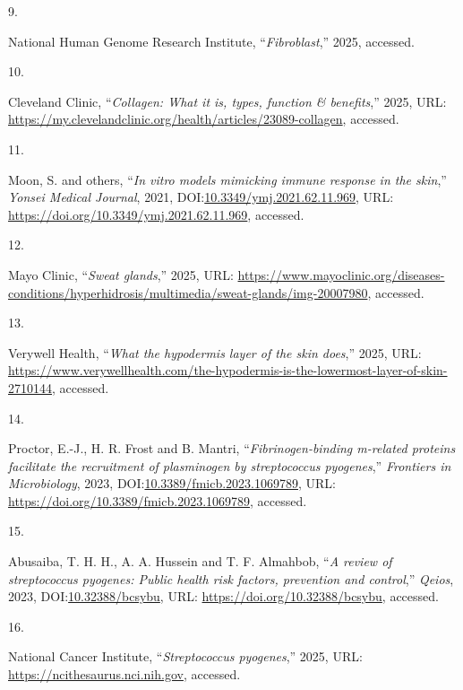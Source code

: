 \documentclass[
]{article}
\newlength{\cslhangindent}
\newlength{\csllabelwidth}
\newenvironment{CSLReferences}[2] %
 {\begin{list}{}{%
  \setlength{\itemindent}{0pt}
  \setlength{\leftmargin}{0pt}
  \setlength{\parsep}{0pt}
  \ifodd #1
   \setlength{\leftmargin}{\cslhangindent}
   \setlength{\itemindent}{-1\cslhangindent}
  \fi
  \setlength{\itemsep}{#2\baselineskip}}}
 {\end{list}}
\newcommand{\CSLLeftMargin}[1]{\parbox[t]{\csllabelwidth}{\strut#1\strut}}
\newcommand{\CSLRightInline}[1]{\parbox[t]{\linewidth - \csllabelwidth}{\strut#1\strut}}
\begin{document}
\begin{CSLReferences}{0}{1}
\CSLLeftMargin{9. }%
\CSLRightInline{National Human Genome Research Institute,
{``\emph{Fibroblast},''} 2025, accessed.}

\CSLLeftMargin{10. }%
\CSLRightInline{Cleveland Clinic, {``\emph{Collagen: What it is, types,
function \& benefits},''} 2025, URL:
\url{https://my.clevelandclinic.org/health/articles/23089-collagen},
accessed.}

\CSLLeftMargin{11. }%
\CSLRightInline{Moon, S. and others, {``\emph{In vitro models mimicking
immune response in the skin},''} \emph{Yonsei Medical Journal}, 2021,
DOI:\href{https://doi.org/10.3349/ymj.2021.62.11.969}{10.3349/ymj.2021.62.11.969},
URL: \url{https://doi.org/10.3349/ymj.2021.62.11.969}, accessed.}

\CSLLeftMargin{12. }%
\CSLRightInline{Mayo Clinic, {``\emph{Sweat glands},''} 2025, URL:
\url{https://www.mayoclinic.org/diseases-conditions/hyperhidrosis/multimedia/sweat-glands/img-20007980},
accessed.}

\CSLLeftMargin{13. }%
\CSLRightInline{Verywell Health, {``\emph{What the hypodermis layer of
the skin does},''} 2025, URL:
\url{https://www.verywellhealth.com/the-hypodermis-is-the-lowermost-layer-of-skin-2710144},
accessed.}

\CSLLeftMargin{14. }%
\CSLRightInline{Proctor, E.-J., H. R. Frost and B. Mantri,
{``\emph{Fibrinogen-binding m-related proteins facilitate the
recruitment of plasminogen by \emph{streptococcus pyogenes}},''}
\emph{Frontiers in Microbiology}, 2023,
DOI:\href{https://doi.org/10.3389/fmicb.2023.1069789}{10.3389/fmicb.2023.1069789},
URL: \url{https://doi.org/10.3389/fmicb.2023.1069789}, accessed.}

\CSLLeftMargin{15. }%
\CSLRightInline{Abusaiba, T. H. H., A. A. Hussein and T. F. Almahbob,
{``\emph{A review of \emph{streptococcus pyogenes}: Public health risk
factors, prevention and control},''} \emph{Qeios}, 2023,
DOI:\href{https://doi.org/10.32388/bcsybu}{10.32388/bcsybu}, URL:
\url{https://doi.org/10.32388/bcsybu}, accessed.}

\CSLLeftMargin{16. }%
\CSLRightInline{National Cancer Institute, {``\emph{Streptococcus
pyogenes},''} 2025, URL: \url{https://ncithesaurus.nci.nih.gov},
accessed.}


\end{CSLReferences}
\end{document}
